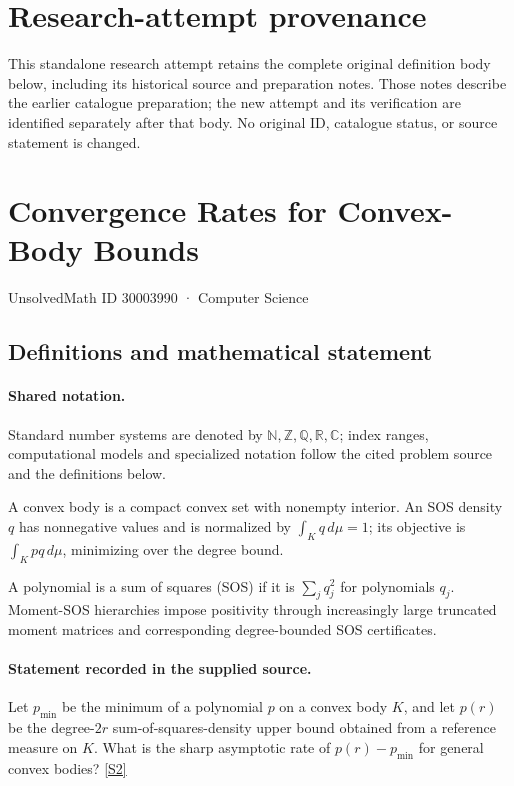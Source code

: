 \documentclass[11pt]{article}
\begin{document}
\section*{Research-attempt provenance}
This standalone research attempt retains the complete original definition body below,
including its historical source and preparation notes. Those notes describe the
earlier catalogue preparation; the new attempt and its verification are identified
separately after that body. No original ID, catalogue status, or source statement is changed.

\section{Convergence Rates for Convex-Body Bounds}\label{30003990}
{\small UnsolvedMath ID 30003990 · Computer Science}
\subsection{Definitions and mathematical statement}

\paragraph{Shared notation.}Standard number systems are denoted by $\mathbb N,\mathbb Z,\mathbb Q,\mathbb R,\mathbb C$; index ranges, computational models and specialized notation follow the cited problem source and the definitions below.


A convex body is a compact convex set with nonempty interior. An SOS density $q$ has nonnegative values and is normalized by $\int_Kq\,d\mu=1$; its objective is $\int_Kp q\,d\mu$, minimizing over the degree bound.

A polynomial is a sum of squares (SOS) if it is $\sum_j q_j^2$ for polynomials $q_j$. Moment-SOS hierarchies impose positivity through increasingly large truncated moment matrices and corresponding degree-bounded SOS certificates.
\paragraph{Statement recorded in the supplied source.}
Let $p_{\min}$ be the minimum of a polynomial $p$ on a convex body $K$, and let $p(r)$ be the degree-$2r$ sum-of-squares-density upper bound obtained from a reference measure on $K$. What is the sharp asymptotic rate of $p(r)-p_{\min}$ for general convex bodies? \href{https://doi.org/10.4171/owr/2018/50}{[S2]}
\end{document}
